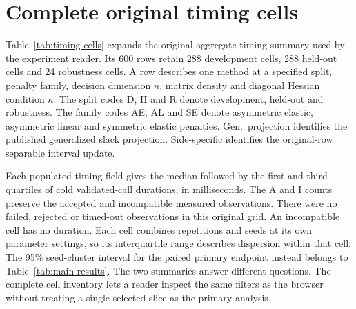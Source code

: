 \section{Complete original timing cells}\label{sec:timing-appendix}

Table~\ref{tab:timing-cells} expands the original aggregate timing summary
used by the experiment reader. Its 600 rows retain 288 development cells,
288 held-out cells and 24 robustness cells. A row describes one method
at a specified split, penalty family, decision dimension $n$, matrix
density and diagonal Hessian condition $\kappa$. The split codes
D, H and R denote development, held-out and robustness. The family codes
AE, AL and SE denote asymmetric elastic, asymmetric linear and symmetric
elastic penalties. Gen.\ projection identifies the published generalized
slack projection. Side-specific identifies the original-row separable
interval update.

Each populated timing field gives the median followed by the first and
third quartiles of cold validated-call durations, in milliseconds.
The A and I counts preserve the accepted and incompatible measured
observations. There were no failed, rejected or timed-out observations in
this original grid. An incompatible cell has no duration. Each cell
combines repetitions and seeds at its own parameter settings, so its
interquartile range describes dispersion within that cell. The 95\%
seed-cluster interval for the paired primary endpoint instead belongs to
Table~\ref{tab:main-results}. The two summaries answer different questions.
The complete cell inventory lets a reader inspect the same filters as
the browser without treating a single selected slice as the primary
analysis.



